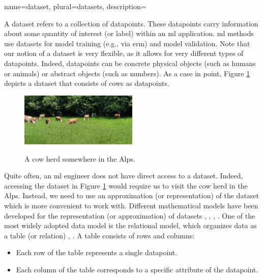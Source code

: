 {name={dataset}, plural={datasets},
	description={A dataset refers to a collection of \glspl{datapoint}. These 
		\glspl{datapoint} carry information about some quantity of interest (or \gls{label}) within 
		an \gls{ml} application. \gls{ml} methods use datasets for \gls{model} training (e.g., via \gls{erm})
		and \gls{model} \gls{validation}. Note that our notion of a dataset is very flexible, as 
		it allows for very different types of \glspl{datapoint}. Indeed, \glspl{datapoint} can be concrete 
		physical objects (such as humans or animals) or abstract objects (such as numbers). 
		As a case in point, Figure \ref{fig_cows_dataset_dict} depicts a dataset that consists of cows as 
		\glspl{datapoint}. 
		\begin{figure}[H]
				\begin{center}
		\label{fig:cowsintheswissalps_dict}
		\includegraphics[width=0.5\textwidth]{assets/CowsAustria.jpg}
		  \end{center}
		\caption{\label{fig_cows_dataset_dict}A cow herd somewhere in the Alps.}
	  \end{figure}
       Quite often, an \gls{ml} engineer does not have direct access to a dataset. Indeed, accessing the 
       dataset in Figure \ref{fig_cows_dataset_dict} would require us to visit the cow herd in the Alps. Instead, 
       we need to use an approximation (or representation) of the dataset which is more convenient 
       to work with. Different mathematical \glspl{model} have been developed for the representation (or approximation) 
       of datasets \cite{silberschatz2019database}, \cite{abiteboul1995foundations}, \cite{hoberman2009data}, \cite{ramakrishnan2002database}. 
       One of the most widely adopted data \gls{model} is the relational \gls{model}, which organizes \gls{data} 
       as a table (or relation) \cite{codd1970relational}, \cite{silberschatz2019database}.
		A table consists of rows and columns:
		\begin{itemize} 
		\item Each row of the table represents a single \gls{datapoint}.
		\item Each column of the table corresponds to a specific attribute of the \gls{datapoint}. 

\end{itemize}}}
